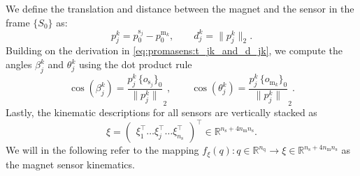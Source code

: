 We define the translation and distance between the magnet and the sensor in the frame $\{S_{0}\}$ as:
\begin{equation}\label{eq:promasens:t_jk_and_d_jk}
    p_j^{k} = p_{0}^{\mathrm{s}_j} - p_{0}^{\mathrm{m}_k}, \qquad  d_j^k = \lVert p_{j}^{k} \rVert_2.
\end{equation}
Building on the derivation in \eqref{eq:promasens:t_jk_and_d_jk}, we compute the angles $\beta_j^k$ and $\theta_j^k$ using the dot product rule
\begin{equation}\label{eq:promasens:theta_jk_and_beta_jk}
    \cos (\beta_j^k) = \frac{p_j^{k} \, \{ o_{\mathrm{s}_j} \}_{0}}{\lVert p_j^{k} \rVert}_2,
    \qquad
    \cos (\theta_j^k) = \frac{p_j^{k} \, \{ o_{\mathrm{m}_k} \}_{0}}{\lVert p_j^{k} \rVert}_2.
\end{equation}
Lastly, the kinematic descriptions for all sensors are vertically stacked as
\begin{equation}
    \xi = \begin{pmatrix} \xi_1^\top \dots \xi_j^\top \dots \xi_{n_\mathrm{s}}^\top \end{pmatrix}^\top \in \mathbb{R}^{n_\mathrm{s} + 4n_\mathrm{m} n_\mathrm{s}}.
\end{equation}
We will in the following refer to the mapping $f_\xi(q): q \in \mathbb{R}^{n_\mathrm{q}}
\rightarrow \xi \in \mathbb{R}^{n_\mathrm{s} + 4n_\mathrm{m} n_\mathrm{s}}$ as the magnet sensor kinematics.


